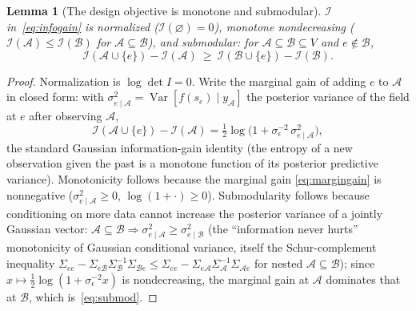 \documentclass[aps,prresearch,reprint,amsmath,amssymb,nofootinbib,superscriptaddress,floatfix]{revtex4-2}
\newtheorem{lemma}[theorem]{Lemma}
\theoremstyle{definition}
\theoremstyle{remark}
\theoremstyle{plain}
\begin{document}
\begin{lemma}[The design objective is monotone and submodular]
\label{lem:submod}
$\mathcal I$ in~\eqref{eq:infogain} is normalized ($\mathcal I(\varnothing)=0$), monotone nondecreasing
($\mathcal I(\mathcal A)\le\mathcal I(\mathcal B)$ for $\mathcal A\subseteq\mathcal B$), and submodular:
for $\mathcal A\subseteq\mathcal B\subseteq V$ and $e\notin\mathcal B$,
\begin{equation}
\mathcal I(\mathcal A\cup\{e\})-\mathcal I(\mathcal A)\ \ge\ \mathcal I(\mathcal B\cup\{e\})-\mathcal
I(\mathcal B).
\label{eq:submod}
\end{equation}
\end{lemma}
\begin{proof}
Normalization is $\log\det I=0$. Write the marginal gain of adding $e$ to $\mathcal A$ in closed form: with
$\sigma^2_{e\mid\mathcal A}=\operatorname{Var}[f(s_e)\mid y_{\mathcal A}]$ the posterior variance of the
field at $e$ after observing $\mathcal A$,
\begin{equation}
\mathcal I(\mathcal A\cup\{e\})-\mathcal I(\mathcal A)
=\tfrac12\log\!\Big(1+\sigma_\epsilon^{-2}\,\sigma^2_{e\mid\mathcal A}\Big),
\label{eq:margingain}
\end{equation}
the standard Gaussian information-gain identity (the entropy of a new observation given the past is a
monotone function of its posterior predictive variance). Monotonicity follows because the marginal gain
\eqref{eq:margingain} is nonnegative ($\sigma^2_{e\mid\mathcal A}\ge0$, $\log(1+\cdot)\ge0$). Submodularity
follows because conditioning on more data cannot increase the posterior variance of a jointly Gaussian
vector: $\mathcal A\subseteq\mathcal B\Rightarrow\sigma^2_{e\mid\mathcal A}\ge\sigma^2_{e\mid\mathcal B}$
(the ``information never hurts'' monotonicity of Gaussian conditional variance, itself the Schur-complement
inequality $\Sigma_{ee}-\Sigma_{e\mathcal B}\Sigma_{\mathcal B}^{-1}\Sigma_{\mathcal B e}\le\Sigma_{ee}
-\Sigma_{e\mathcal A}\Sigma_{\mathcal A}^{-1}\Sigma_{\mathcal A e}$ for nested $\mathcal
A\subseteq\mathcal B$); since $x\mapsto\tfrac12\log(1+\sigma_\epsilon^{-2}x)$ is nondecreasing, the marginal
gain at $\mathcal A$ dominates that at $\mathcal B$, which is~\eqref{eq:submod}.
\end{proof}
\end{document}
